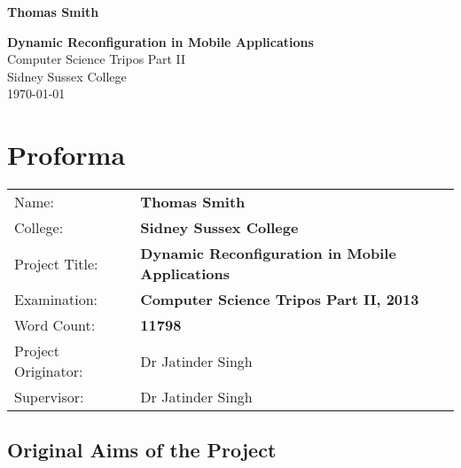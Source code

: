 \documentclass[12pt,twoside,notitlepage]{report}
\newcommand{\disstitle}{Dynamic Reconfiguration in Mobile Applications}
\newcommand{\wordcount}{11798}
\begin{document}


\pagestyle{empty}

\hfill{\LARGE \bf Thomas Smith}

\vspace*{60mm}
\begin{center}
\Huge
{\bf \disstitle} \\
\vspace*{5mm}
Computer Science Tripos Part II \\
\vspace*{5mm}
Sidney Sussex College \\
\vspace*{5mm}
\today  %
\end{center}

\cleardoublepage


\setcounter{page}{1}
\pagestyle{plain}

\chapter*{Proforma}

{\large
\begin{tabular}{l p{9.5cm}}
Name:               & \bf Thomas Smith	\\
College:            & \bf Sidney Sussex College	\\
Project Title:      & \bf \disstitle	\\
Examination:        & \bf Computer Science Tripos Part II, 2013 	\\
Word Count:         & \bf\wordcount\footnotemark[1] \\
Project Originator: & Dr Jatinder Singh		\\
Supervisor:         & Dr Jatinder Singh		\\ 
\end{tabular}
}



\section*{Original Aims of the Project}
\end{document}
